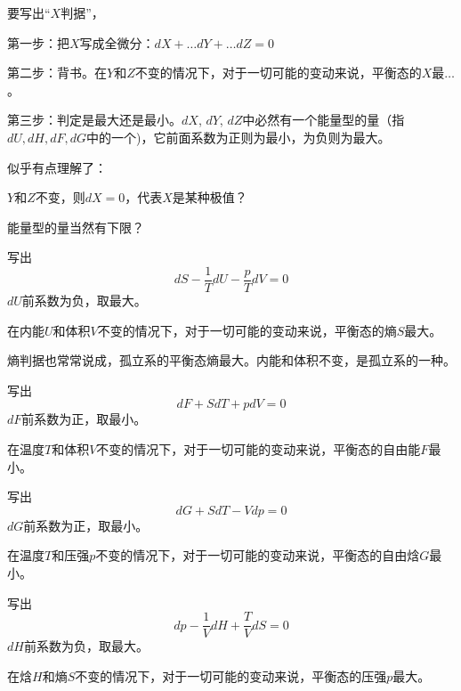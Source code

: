 \documentclass[CJK]{beamer}
\begin{document}
\begin{frame}
\bch
{}

要写出“$X$判据”，

\bitem
\item{第一步：把$X$写成全微分：$dX + \ldots dY + \ldots dZ = 0$}
\item{第二步：背书。在$Y$和$Z$不变的情况下，对于一切可能的变动来说，平衡态的$X$最$\ldots$。}
\item{第三步：判定是最大还是最小。$dX$, $dY$, $dZ$中必然有一个能量型的量（指$dU, dH, dF, dG$中的一个)，它前面系数为正则为最小，为负则为最大。}
\eitem

{\scriptsize
似乎有点理解了：

$Y$和$Z$不变，则$dX = 0$，代表$X$是某种极值？

能量型的量当然有下限？
}
\ech
\end{frame}


\begin{frame}
\bch
写出
$$dS - \frac{1}{T} dU - \frac{p}{T} dV = 0 $$
$dU$前系数为负，取最大。

在内能$U$和体积$V$不变的情况下，对于一切可能的变动来说，平衡态的熵$S$最大。

\skiplines

熵判据也常常说成，孤立系的平衡态熵最大。内能和体积不变，是孤立系的一种。
\ech
\end{frame}


\begin{frame}
\bch
写出
$$dF  + S dT + p dV = 0 $$
$dF$前系数为正，取最小。


在温度$T$和体积$V$不变的情况下，对于一切可能的变动来说，平衡态的自由能$F$最小。

\ech
\end{frame}


\begin{frame}
\bch
写出
$$dG + S dT - V dp = 0$$
$dG$前系数为正，取最小。

在温度$T$和压强$p$不变的情况下，对于一切可能的变动来说，平衡态的自由焓$G$最小。

\ech
\end{frame}


\begin{frame}
\bch
写出
$$dp - \frac{1}{V} dH + \frac{T}{V} dS = 0$$
$dH$前系数为负，取最大。

在焓$H$和熵$S$不变的情况下，对于一切可能的变动来说，平衡态的压强$p$最大。

\ech
\end{frame}
\end{document}
